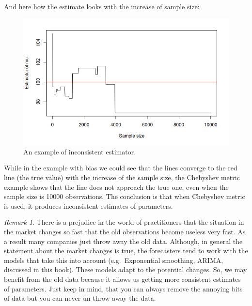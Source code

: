 \documentclass[
]{book}
\newenvironment{Shaded}{\begin{snugshade}}{\end{snugshade}}
\newcommand{\AttributeTok}[1]{\textcolor[rgb]{0.13,0.29,0.53}{#1}}
\newcommand{\DecValTok}[1]{\textcolor[rgb]{0.00,0.00,0.81}{#1}}
\newcommand{\FunctionTok}[1]{\textcolor[rgb]{0.13,0.29,0.53}{\textbf{#1}}}
\newcommand{\NormalTok}[1]{#1}
\newcommand{\SpecialCharTok}[1]{\textcolor[rgb]{0.81,0.36,0.00}{\textbf{#1}}}
\newcommand{\StringTok}[1]{\textcolor[rgb]{0.31,0.60,0.02}{#1}}
\theoremstyle{definition}
\theoremstyle{definition}
\theoremstyle{definition}
\theoremstyle{definition}
\theoremstyle{remark}
\newtheorem*{remark}{Remark}
\begin{document}
And here how the estimate looks with the increase of sample size:

\begin{Shaded}
\end{Shaded}

\begin{figure}
\centering
\includegraphics{images/02-statistics-consistency.png}
\caption{\label{fig:statsConsistency}An example of inconsistent estimator.}
\end{figure}

While in the example with bias we could see that the lines converge to the red line (the true value) with the increase of the sample size, the Chebyshev metric example shows that the line does not approach the true one, even when the sample size is 10000 observations. The conclusion is that when Chebyshev metric is used, it produces inconsistent estimates of parameters.

\begin{remark}
There is a prejudice in the world of practitioners that the situation in the market changes so fast that the old observations become useless very fast. As a result many companies just throw away the old data. Although, in general the statement about the market changes is true, the forecasters tend to work with the models that take this into account (e.g.~Exponential smoothing, ARIMA, discussed in this book). These models adapt to the potential changes. So, we may benefit from the old data because it allows us getting more consistent estimates of parameters. Just keep in mind, that you can always remove the annoying bits of data but you can never un-throw away the data.
\end{remark}
\end{document}
